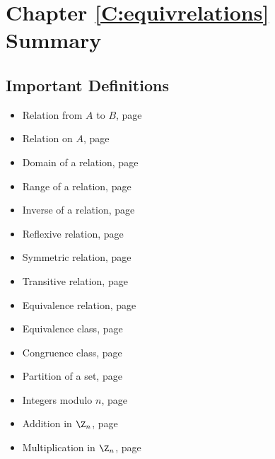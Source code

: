 \newpage
\section{Chapter \ref{C:equivrelations} Summary} \label{Su:equivrelations}
\subsection*{Important Definitions}
\begin{multicols}{2}
\begin{itemize}
\item Relation from $A$ to $B$, page~\pageref*{relation}
\item Relation on $A$, page~\pageref*{relation}
\item Domain of a relation, page~\pageref*{domrangeofrelation}
\item Range of a relation, page~\pageref*{domrangeofrelation}
\item Inverse of a relation, page~\pageref*{inverseofrelation}
\item Reflexive relation, page~\pageref*{ref-sym-trans}
\item Symmetric relation, page~\pageref*{ref-sym-trans}
\item Transitive relation, page~\pageref*{ref-sym-trans}
\item Equivalence relation, page~\pageref*{equivalencerelation}
\item Equivalence class, page~\pageref*{equivalenceclass}
\item Congruence class, page~\pageref*{congclass}
\item Partition of a set, page~\pageref*{partition}
\item Integers modulo $n$, page~\pageref*{integersmodn}
\item Addition in $\Z_n$, page~\pageref*{modulararithmetic}
\item Multiplication in $\Z_n$, page~\pageref*{modulararithmetic}
\end{itemize}
\end{multicols}
\hbreak



